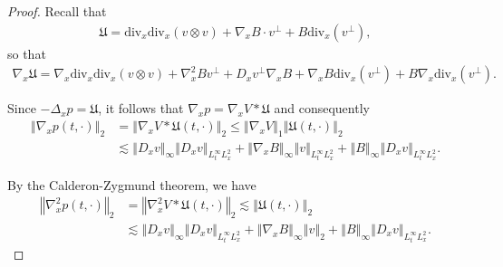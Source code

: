 \documentclass[11pt,reqno]{amsart}
\numberwithin{equation}{section}
\begin{document}
\begin{proof}
Recall that 
\begin{align*}
\mathfrak{U}=\mathrm{div}_{x}\mathrm{div}_{x}(v\otimes v)+\nabla_{x}B \cdot v^{\perp}+B\mathrm{div}_{x}(v^{\perp}),
\end{align*}
so that
\begin{align*}
\nabla_{x}\mathfrak{U}=\nabla_{x}\mathrm{div}_{x}\mathrm{div}_{x}(v\otimes v)+\nabla_{x}^{2}Bv^{\perp}+D_{x}v^{\perp}\nabla_{x}B +\nabla_{x}B\mathrm{div}_{x}(v^{\perp})+B\nabla_{x}\mathrm{div}_{x}(v^{\perp}).    
\end{align*}

Since $-\Delta_{x} p=\mathfrak{U}$, it follows that  $\nabla_{x}p=\nabla_{x}V\ast \mathfrak{U}$ and consequently 
\begin{align*}
\left\Vert \nabla_{x}p(t,\cdot)\right\Vert_{2}&=\left\Vert \nabla_{x}V\ast \mathfrak{U}(t,\cdot)\right\Vert_{2}\leq \left\Vert \nabla_{x}V\right\Vert_{1} \left\Vert \mathfrak{U}(t,\cdot) \right\Vert_{2}\\
&\lesssim \left\Vert D_{x}v\right\Vert_{\infty} \left\Vert D_{x}v\right\Vert_{L^{\infty}_{t}L^{2}_{x}}+\left\Vert \nabla_{x}B\right\Vert_{\infty}\left\Vert v\right\Vert_{L^{\infty}_{t}L^2_{x}}+\left\Vert B\right\Vert_{\infty}\left\Vert D_{x}v\right\Vert_{L^{\infty}_{t}L^{2}_{x}}.  
\end{align*}

By the Calderon-Zygmund theorem, we have 
\begin{align*}
 \left\Vert \nabla_{x}^{2}p(t,\cdot)\right\Vert_{2}&=\left\Vert \nabla _{x}
 ^{2}V\ast \mathfrak{U}(t,\cdot)\right\Vert_{2}\lesssim \left\Vert \mathfrak{U}(t,\cdot)\right\Vert_{2}\\
 &\lesssim  \left\Vert D_{x}v\right\Vert_{\infty}\left\Vert D_{x}v\right\Vert_{L^{\infty}_{t}L^2_{x}}+\left\Vert \nabla_{x}B\right\Vert_{\infty}\left\Vert v\right\Vert_{2}+\left\Vert B\right\Vert_{\infty}\left\Vert D_{x}v\right\Vert_{L^{\infty}_{t}L^{2}_{x}} .    \end{align*}
 

\end{proof}
\end{document}
